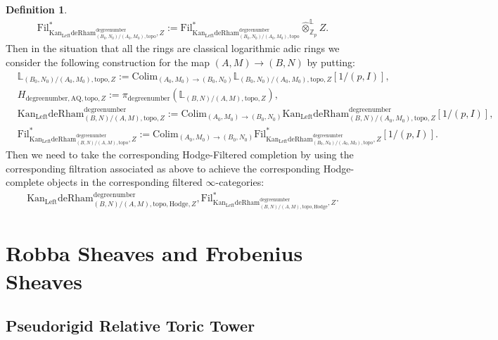 \documentclass[11pt]{book}
\theoremstyle{definition}
\newtheorem{definition}[theorem]{Definition}
\numberwithin{equation}{section}
\begin{document}
\begin{definition}
\begin{align}
\mathrm{Fil}^*_{\mathrm{Kan}_\mathrm{Left}\mathrm{deRham}^\text{degreenumber}_{(B_0,N_0)/(A_0,M_0),\mathrm{topo}},Z}:=\mathrm{Fil}^*_{\mathrm{Kan}_\mathrm{Left}\mathrm{deRham}^\text{degreenumber}_{(B_0,N_0)/(A_0,M_0),\mathrm{topo}}}\widehat{\otimes}^\mathbb{L}_{\mathbb{Z}_p}Z.	
\end{align}
Then in the situation that all the rings are classical logarithmic adic rings we consider the following construction for the map $(A,M)\rightarrow (B,N)$ by putting:
\begin{align}
&\mathbb{L}_{(B_0,N_0)/(A_0,M_0),\mathrm{topo},Z}:= \mathrm{Colim}_{(A_0,M_0)\rightarrow (B_0,N_0)}\mathbb{L}_{(B_0,N_0)/(A_0,M_0),\mathrm{topo},Z}[1/(p,I)],\\
&H_{\text{degreenumber},{\mathrm{AQ}},\mathrm{topo},Z}:=\pi_\text{degreenumber} (\mathbb{L}_{(B,N)/(A,M),\mathrm{topo},Z}),	\\
&\mathrm{Kan}_\mathrm{Left}\mathrm{deRham}^\text{degreenumber}_{(B,N)/(A,M),\mathrm{topo},Z}:=\mathrm{Colim}_{(A_0,M_0)\rightarrow (B_0,N_0)}\mathrm{Kan}_\mathrm{Left}\mathrm{deRham}^\text{degreenumber}_{(B,N)/(A_0,M_0),\mathrm{topo},Z}[1/(p,I)],\\
&\mathrm{Fil}^*_{\mathrm{Kan}_\mathrm{Left}\mathrm{deRham}^\text{degreenumber}_{(B,N)/(A,M),\mathrm{topo}},Z}:=\mathrm{Colim}_{(A_0,M_0)\rightarrow (B_0,N_0)}\mathrm{Fil}^*_{\mathrm{Kan}_\mathrm{Left}\mathrm{deRham}^\text{degreenumber}_{(B_0,N_0)/(A_0,M_0),\mathrm{topo}},Z}[1/(p,I)].
\end{align}
Then we need to take the corresponding Hodge-Filtered completion by using the corresponding filtration associated as above to achieve the corresponding Hodge-complete objects in the corresponding filtered $\infty$-categories:
\begin{align}
{\mathrm{Kan}_\mathrm{Left}\mathrm{deRham}}^\text{degreenumber}_{(B,N)/(A,M),\mathrm{topo,Hodge},Z},\mathrm{Fil}^*_{{\mathrm{Kan}_\mathrm{Left}\mathrm{deRham}}^\text{degreenumber}_{(B,N)/(A,M),\mathrm{topo,Hodge}},Z}.	
\end{align} 	
\end{definition}



\newpage

\section{Robba Sheaves and Frobenius Sheaves}

\subsection{Pseudorigid Relative Toric Tower}
\end{document}
